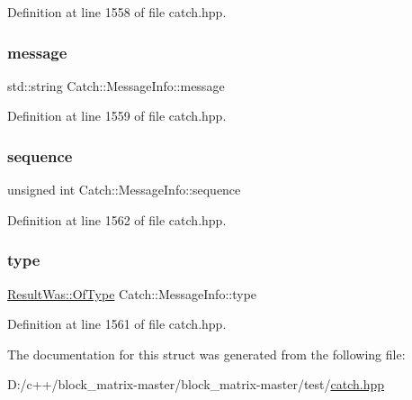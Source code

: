 Definition at line 1558 of file catch.\+hpp.

\mbox{\label{struct_catch_1_1_message_info_ab6cd06e050bf426c6577502a5c50e256}} 
\subsubsection{\texorpdfstring{message}{message}}
{\footnotesize\ttfamily std\+::string Catch\+::\+Message\+Info\+::message}



Definition at line 1559 of file catch.\+hpp.

\mbox{\label{struct_catch_1_1_message_info_a7f4f57ea21e50160adefce7b68a781d6}} 
\subsubsection{\texorpdfstring{sequence}{sequence}}
{\footnotesize\ttfamily unsigned int Catch\+::\+Message\+Info\+::sequence}



Definition at line 1562 of file catch.\+hpp.

\mbox{\label{struct_catch_1_1_message_info_ae928b9117465c696e45951d9d0284e78}} 
\subsubsection{\texorpdfstring{type}{type}}
{\footnotesize\ttfamily \mbox{\hyperlink{struct_catch_1_1_result_was_a624e1ee3661fcf6094ceef1f654601ef}{Result\+Was\+::\+Of\+Type}} Catch\+::\+Message\+Info\+::type}



Definition at line 1561 of file catch.\+hpp.



The documentation for this struct was generated from the following file\+:\begin{DoxyCompactItemize}
\item 
D\+:/c++/block\+\_\+matrix-\/master/block\+\_\+matrix-\/master/test/\mbox{\hyperlink{catch_8hpp}{catch.\+hpp}}\end{DoxyCompactItemize}
